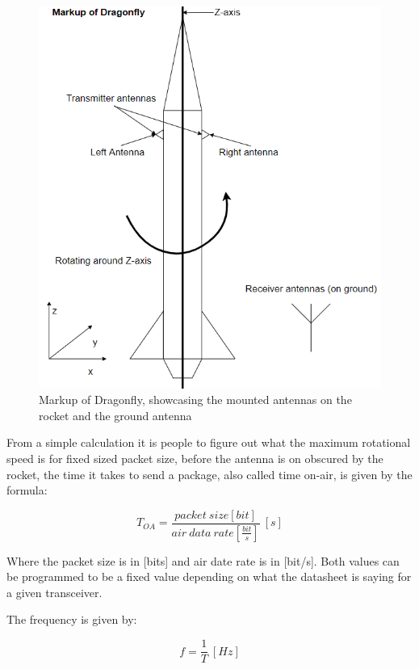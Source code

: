 \begin{figure}[h]
\centering
\includegraphics[scale=1]{figures/RocketShading.PNG}
\caption{Markup of Dragonfly, showcasing the mounted antennas on the rocket and the ground antenna}
\end{figure}

From a simple calculation it is people to figure out what the maximum rotational speed is for fixed sized packet size, before the antenna is on obscured by the rocket, the time it takes to send a package, also called time on-air, is given by the formula:

\begin{equation}
    T_{OA} = \frac{packet\ size [bit]}{air\ data\ rate [\frac{bit}{s}]}\ [s]
\end{equation}

Where the packet size is in [bits] and air date rate is in [bit/s]. Both values can be programmed to be a fixed value depending on what the datasheet is saying for a given transceiver. 

The frequency is given by:

\begin{equation}
    f = \frac{1}{T}\ [Hz]
\end{equation}

